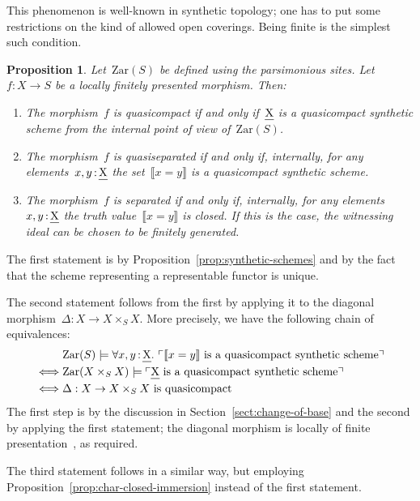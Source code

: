 \documentclass[10pt,reqno,a4paper]{amsbook}
\makeatletter
\theoremstyle{definition}
\theoremstyle{plain}
\newtheorem{prop}[defn]{Proposition}
\theoremstyle{remark}
\let\oldul\ul
\renewcommand{\ul}[1]{\text{\oldul{$#1$}}}
\newcommand{\Zar}{\mathrm{Zar}}
\newcommand{\?}{\,{:}\,}
\renewcommand{\_}{\mathpunct{.}\,}
\newcommand{\speak}[1]{\ulcorner\text{\textnormal{#1}}\urcorner}
\newcommand{\brak}[1]{{\llbracket{#1}\rrbracket}}
\newcommand{\stacksproject}[1]{\cite[{\href{https://stacks.math.columbia.edu/tag/#1}{Tag~#1}}]{stacks-project}}
\renewenvironment{proof}[1][\proofname]{\par
  \pushQED{\qed}%
  \normalfont \topsep6\p@\@plus6\p@\relax
  \trivlist
  \item[\hskip\labelsep
        \itshape
    #1\@addpunct{.}]\ignorespaces
}{%
  \popQED\endtrivlist\@endpefalse
}
\makeatother
\begin{document}
This phenomenon is well-known in synthetic topology; one has to put some
restrictions on the kind of allowed open coverings. Being finite is the
simplest such condition.

\begin{prop}\label{prop:big-char-qcqs}
Let~$\Zar(S)$ be defined using the parsimonious sites. Let~$f : X \to
S$ be a locally finitely presented morphism. Then:
\begin{enumerate}
\item The morphism~$f$ is quasicompact if and only if~$\ul{X}$ is a
quasicompact synthetic scheme from the internal point of view of~$\Zar(S)$.
\item The morphism~$f$ is quasiseparated if and only if, internally, for any
elements~$x,y \? \ul{X}$ the set~$\brak{x = y}$ is a quasicompact synthetic
scheme.
\item The morphism~$f$ is separated if and only if, internally, for any
elements~$x,y \? \ul{X}$ the truth value~$\brak{x = y}$ is closed. If this is
the case, the witnessing ideal can be chosen to be finitely generated.
\end{enumerate}
\end{prop}

\begin{proof}The first statement is by Proposition~\ref{prop:synthetic-schemes}
and by the fact that the scheme representing a representable functor is unique.

The second statement follows from the first by applying it to the diagonal
morphism~$\Delta : X \to X \times_S X$. More precisely, we have the following
chain of equivalences:
\begin{align*}
  &\mathrel{\phantom{\Longleftrightarrow}}
  \Zar(S) \models \forall x,y\?\ul{X}\_
    \speak{$\brak{x = y}$ is a quasicompact synthetic scheme} \\
  &\Longleftrightarrow
  \Zar(X \times_S X) \models
    \speak{$\ul{X}$ is a quasicompact synthetic scheme} \\
  &\Longleftrightarrow
  \text{$\Delta : X \to X \times_S X$ is quasicompact}
\end{align*}
The first step is by the discussion in Section~\ref{sect:change-of-base} and
the second by applying the first statement; the diagonal morphism is locally of
finite presentation~\stacksproject{0818}, as required.

The third statement follows in a similar way, but employing
Proposition~\ref{prop:char-closed-immersion} instead of the first statement.
\end{proof}
\end{document}
